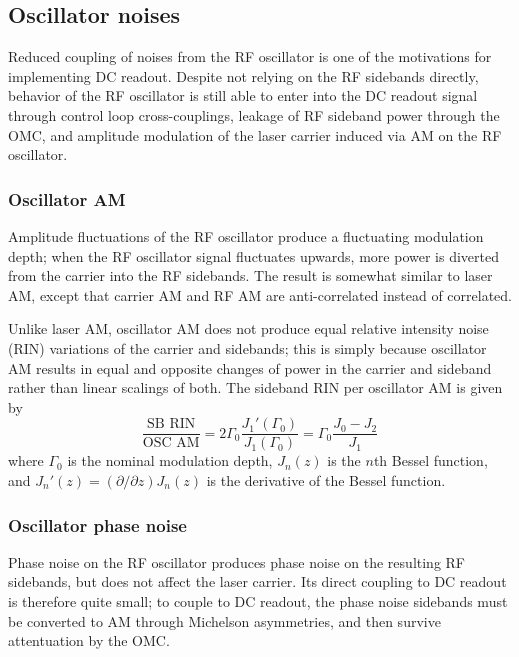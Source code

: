 \subsection{Oscillator noises}

Reduced coupling of noises from the RF oscillator is one of the
motivations for implementing DC readout. Despite not relying on the RF
sidebands directly, behavior of the RF oscillator is still able to
enter into the DC readout signal through control loop cross-couplings,
leakage of RF sideband power through the OMC, and amplitude modulation
of the laser carrier induced via AM on the RF oscillator.

\subsubsection{Oscillator AM}

Amplitude fluctuations of the RF oscillator produce a fluctuating modulation
depth; when the RF oscillator signal fluctuates upwards, more power is diverted
from the carrier into the RF sidebands.  The result is somewhat similar to laser
AM, except that carrier AM and RF AM are anti-correlated instead of correlated.

Unlike laser AM, oscillator AM does not produce equal relative intensity noise
(RIN) variations of the carrier and sidebands; this is simply because oscillator
AM results in equal and opposite changes of power in the carrier and sideband
rather than linear scalings of both.  The sideband RIN per oscillator AM is
given by
\begin{equation}
\frac{\text{SB RIN}}{\text{OSC AM}}=2\Gamma_{0}\frac{J_{1}'(\Gamma_{0})}{J_{1}(\Gamma_{0})}=\Gamma_{0}\frac{J_{0}-J_{2}}{J_{1}}
\end{equation}
where $\Gamma_0$ is the nominal modulation depth, $J_n(z)$ is the $n$th Bessel
function, and $J_n'(z)=(\partial/\partial z)J_n(z)$ is the derivative of the Bessel function.

\subsubsection{Oscillator phase noise}

Phase noise on the RF oscillator produces phase noise on the resulting
RF sidebands, but does not affect the laser carrier.  Its direct
coupling to DC readout is therefore quite small; to couple to DC
readout, the phase noise sidebands must be converted to AM through
Michelson asymmetries, and then survive attentuation by the OMC.

